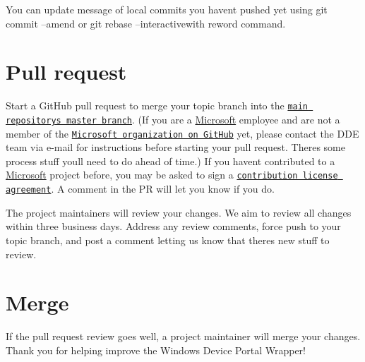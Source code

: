 You can update message of local commits you haven\textquotesingle{}t pushed yet using git commit --amend or git rebase --interactivewith reword command.

\section*{Pull request}

Start a Git\+Hub pull request to merge your topic branch into the \href{https://github.com/Microsoft/WindowsDevicePortalWrapper/tree/master}{\tt main repository\textquotesingle{}s master branch}. (If you are a \hyperlink{namespace_microsoft}{Microsoft} employee and are not a member of the \href{https://github.com/Microsoft}{\tt Microsoft organization on Git\+Hub} yet, please contact the D\+DE team via e-\/mail for instructions before starting your pull request. There\textquotesingle{}s some process stuff you\textquotesingle{}ll need to do ahead of time.) If you haven\textquotesingle{}t contributed to a \hyperlink{namespace_microsoft}{Microsoft} project before, you may be asked to sign a \href{https://cla.microsoft.com/}{\tt contribution license agreement}. A comment in the PR will let you know if you do.

The project maintainers will review your changes. We aim to review all changes within three business days. Address any review comments, force push to your topic branch, and post a comment letting us know that there\textquotesingle{}s new stuff to review.

\section*{Merge}

If the pull request review goes well, a project maintainer will merge your changes. Thank you for helping improve the Windows Device Portal Wrapper! 